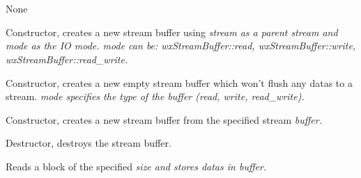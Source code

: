 \section{}\label{wxstreambuf}


None






Constructor, creates a new stream buffer using \it{stream} as a parent stream
and \it{mode} as the IO mode. \it{mode} can be: wxStreamBuffer::read,
wxStreamBuffer::write, wxStreamBuffer::read\_write.



Constructor, creates a new empty stream buffer which won't flush any datas
to a stream. \it{mode} specifies the type of the buffer (read, write, read\_write).



Constructor, creates a new stream buffer from the specified stream \it{buffer}.



Destructor, destroys the stream buffer.

\label{wxstreambufread}


Reads a block of the specified \it{size} and stores datas in \it{buffer}.


